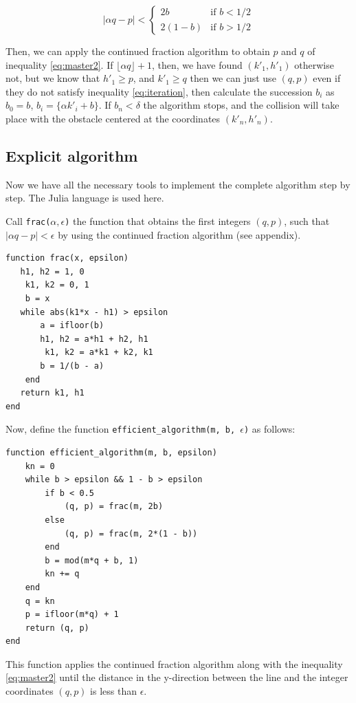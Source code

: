 \documentclass[prl,amsmath,amssymb, twocolumn, showpacs]{revtex4-1}
\begin{document}
\begin{equation}
|\alpha  q-p|< \begin{cases} 2b &\mbox{if } b < 1/2 \\  2(1-b) & \mbox{if } b > 1/2 \end{cases}
\label{eq:master2}
\end{equation}

Then, we can apply the continued fraction algorithm to obtain $p$ and $q$ of inequality \ref{eq:master2}. If $\lfloor \alpha q  \rfloor+1$, then, we have found $(k'_1,h'_1)$ otherwise not, but we know that $h'_1\geq p$, and $k'_1 \geq q$ then we can just use $(q,p)$ even if they do not satisfy inequality \ref{eq:iteration}, then calculate the succession $b_i$ as $b_0=b$, $b_i=\{\alpha k'_i+b\}$. If $b_n<\delta$ the algorithm stops, and the collision will take place with the obstacle centered at the coordinates $(k'_n,h'_n)$. 

\subsection{Explicit algorithm}

Now we have all the necessary tools to implement the complete algorithm step by step. The Julia language is used here.

Call \texttt{frac($\alpha, \epsilon$)} the function that obtains the first integers $(q,p)$, such that $|\alpha q-p|<\epsilon$ by using the continued fraction algorithm (see appendix). 

\begin{verbatim}
function frac(x, epsilon) 
   h1, h2 = 1, 0 
    k1, k2 = 0, 1 
    b = x 
   while abs(k1*x - h1) > epsilon 
       a = ifloor(b) 
       h1, h2 = a*h1 + h2, h1 
        k1, k2 = a*k1 + k2, k1 
       b = 1/(b - a) 
    end 
   return k1, h1 
end
\end{verbatim}


Now, define the function \texttt{efficient\_algorithm(m, b, $\epsilon$)} as follows: 
\begin{verbatim}
function efficient_algorithm(m, b, epsilon) 
    kn = 0 
    while b > epsilon && 1 - b > epsilon 
        if b < 0.5 
            (q, p) = frac(m, 2b) 
        else 
            (q, p) = frac(m, 2*(1 - b)) 
        end 
        b = mod(m*q + b, 1) 
        kn += q 
    end 
    q = kn 
    p = ifloor(m*q) + 1 
    return (q, p) 
end
\end{verbatim}

This function applies the continued fraction algorithm along with the inequality \ref{eq:master2} until the distance in the y-direction between the line and the integer coordinates $(q, p)$ is less than $\epsilon$. 
\end{document}
